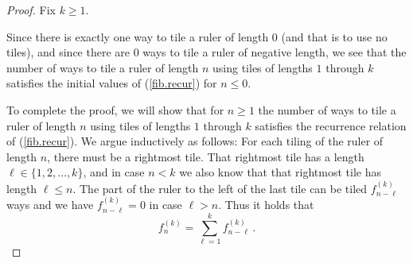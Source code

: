 \documentclass[11pt,reqno]{amsart}
\theoremstyle{plain}
\numberwithin{equation}{section}
\newtheorem{definition}[thm]{Definition}
\newtheorem*{remark}{Remark}
\begin{document}
\begin{proof}  Fix $k\geq 1$.  

Since there is exactly   one way to 
tile a ruler of length $0$ (and that is to use no tiles), and since 
there are $0$ ways to tile a ruler of negative length,
we see that the number of ways to tile 
a ruler of length $n$ using  tiles of lengths $1$ through $k$ satisfies the initial values of
(\ref{fib.recur}) for $n\leq 0$.

To complete the proof, we will show that for $n\geq 1$ the number of ways to tile
a ruler of length $n$ using  tiles of lengths $1$ through $k$ satisfies 
the recurrence relation of (\ref{fib.recur}). We argue inductively as follows:
For each tiling of the ruler of length $n$, there must be a rightmost tile.
That rightmost tile has a length $\ell\in\{1,2,\dots,k\}$, and in case
$n<k$ we also know that that rightmost tile has length $\ell \leq n$. 
The part of the
ruler to the left of the last tile can be tiled $f_{n-\ell}^{(k)}$ ways and we have
$f_{n-\ell}^{(k)} = 0$  in case $\ell > n$.
Thus it holds that 
\[
f_{n}^{(k)} = \sum_{\ell=1}^k f_{n-\ell}^{(k)}\,.
\]

\end{proof}


\end{document}
